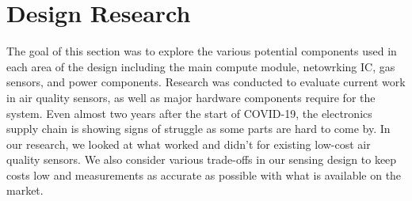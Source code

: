 
\section{Design Research}
The goal of this section was to explore the various potential components used in
each area of the design including the main compute module, netowrking IC, gas
sensors, and power components. Research was conducted to evaluate current work 
in air quality sensors, as well as major hardware components require for the 
system. Even almost two years after the start of COVID-19, the electronics supply
chain is showing signs of struggle
as some parts are hard to come by. In our research, we looked at what worked and
didn't for existing low-cost air quality sensors. We also consider various
trade-offs in our sensing design to keep costs low and measurements as accurate
as possible with what is available on the market. 

